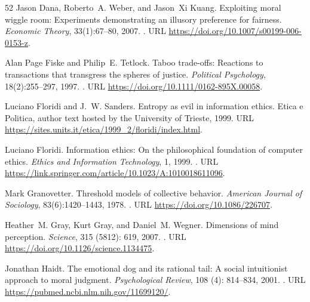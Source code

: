\documentclass[11pt,a4paper]{article}
\theoremstyle{remark}
\begin{document}
\begin{thebibliography}{52}
Jason Dana, Roberto~A. Weber, and Jason~Xi Kuang.
\newblock Exploiting moral wiggle room: Experiments demonstrating an illusory
preference for fairness.
\newblock \emph{Economic Theory}, 33(1):67--80, 2007.
\newblock {}.
\newblock URL \url{https://doi.org/10.1007/s00199-006-0153-z}.

Alan Page Fiske and Philip~E. Tetlock.
\newblock Taboo trade-offs: Reactions to transactions that transgress the spheres of justice.
\newblock \emph{Political Psychology}, 18(2):255--297, 1997.
\newblock {}.
\newblock URL \url{https://doi.org/10.1111/0162-895X.00058}.

Luciano Floridi and J.~W. Sanders.
\newblock Entropy as evil in information ethics.
\newblock Etica e Politica, author text hosted by the University of Trieste,
  1999.
\newblock URL \url{https://sites.units.it/etica/1999_2/floridi/index.html}.

Luciano Floridi.
\newblock Information ethics: On the philosophical foundation of computer
  ethics.
\newblock \emph{Ethics and Information Technology}, 1, 1999.
\newblock {}.
\newblock URL \url{https://link.springer.com/article/10.1023/A:1010018611096}.

Mark Granovetter.
\newblock Threshold models of collective behavior.
\newblock \emph{American Journal of Sociology}, 83(6):1420--1443, 1978.
\newblock {}.
\newblock URL \url{https://doi.org/10.1086/226707}.

Heather~M. Gray, Kurt Gray, and Daniel~M. Wegner.
\newblock Dimensions of mind perception.
\newblock \emph{Science}, 315 (5812): 619, 2007.
\newblock {}.
\newblock URL \url{https://doi.org/10.1126/science.1134475}.

Jonathan Haidt.
\newblock The emotional dog and its rational tail: A social intuitionist
  approach to moral judgment.
\newblock \emph{Psychological Review}, 108 (4): 814--834,
  2001.
\newblock {}.
\newblock URL \url{https://pubmed.ncbi.nlm.nih.gov/11699120/}.


\end{thebibliography}
\end{document}
